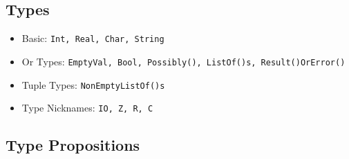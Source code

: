 \documentclass{article}
\begin{document}
\subsection{Types}

\begin{itemize}
\item Basic: \texttt{Int, Real, Char, String}
\item Or Types: \texttt{EmptyVal, Bool, Possibly(), ListOf()s, Result()OrError()}
\item Tuple Types: \texttt{NonEmptyListOf()s}
\item Type Nicknames: \texttt{IO, Z, R, C}
\end{itemize}

\subsection{Type Propositions}
\end{document}
